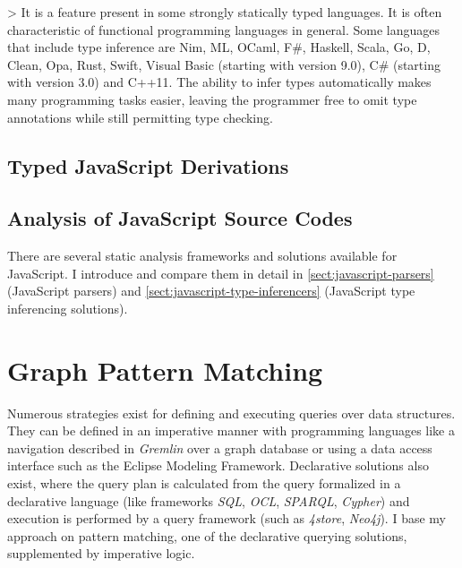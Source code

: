 > It is a feature present in some strongly statically typed languages. It is often characteristic of functional programming languages in general. Some languages that include type inference are Nim, ML, OCaml, F\#, Haskell, Scala, Go, D, Clean, Opa, Rust, Swift, Visual Basic (starting with version 9.0), C\# (starting with version 3.0) and C++11. The ability to infer types automatically makes many programming tasks easier, leaving the programmer free to omit type annotations while still permitting type checking.


\subsection{Typed JavaScript Derivations}

\subsection{Analysis of JavaScript Source Codes}
There are several static analysis frameworks and solutions available for JavaScript. I introduce and compare them in detail in \cref{sect:javascript-parsers} (JavaScript parsers) and \cref{sect:javascript-type-inferencers} (JavaScript type inferencing solutions).

\section{Graph Pattern Matching}
Numerous strategies exist for defining and executing queries over data structures. They can be defined in an imperative manner with programming languages like a navigation described in \emph{Gremlin} over a graph database or using a data access interface such as the Eclipse Modeling Framework. Declarative solutions also exist, where the query plan is calculated from the query formalized in a declarative language (like frameworks \emph{SQL}, \emph{OCL}, \emph{SPARQL}, \emph{Cypher}) and execution is performed by a query framework (such as \emph{4store}, \emph{Neo4j}). I base my approach on pattern matching, one of the declarative querying solutions, supplemented by imperative logic.

